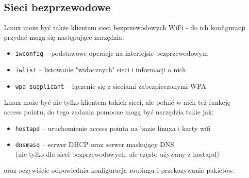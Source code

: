 % 
% 
% 
% 

\subsection{Sieci bezprzewodowe}

Linux może być także klientem sieci bezprzewodowych WiFi - do ich konfiguracji przydać mogą się następujące narzędzia:
\begin{itemize}
	\item \Verb#iwconfig# –
		podstawowe operacje na interfejsie bezprzewodowym
	\item \Verb#iwlist# –
		listowanie "widocznych" sieci i informacji o nich
	\item \Verb#wpa_supplicant# –
		łączenie się z sieciami zabezpieczonymi WPA
\end{itemize}

\vspace{4pt}\noindent
Linux może być nie tylko klientem takich sieci, ale pełnić w nich też funkcję access pointu, do tego zadania pomocne mogą być narzędzia takie jak:
\begin{itemize}
	\item \Verb#hostapd# –
		uruchomienie access pointa na bazie linuxa i karty wifi
	\item \Verb#dnsmasq# –
		serwer DHCP oraz serwer maskujący DNS \\ (nie tylko dla sieci bezprzewodowych, ale często używany z hostapd)
\end{itemize}
oraz oczywiście odpowiednia konfiguracja routingu i przekazywania pakietów.
